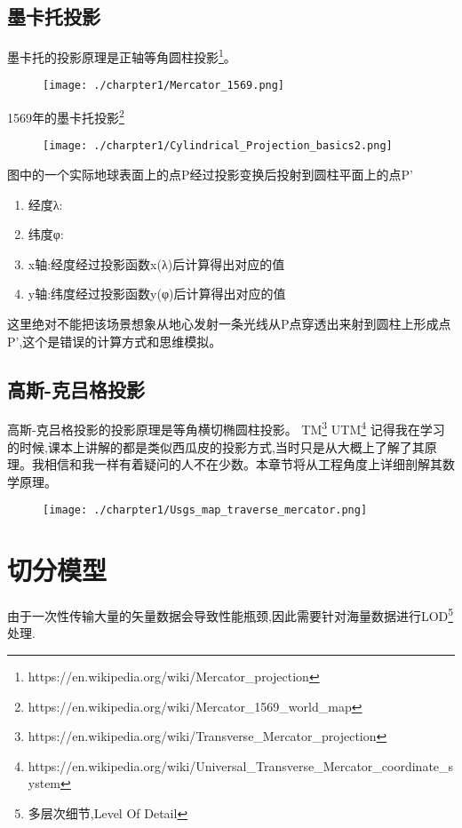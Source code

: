 \subsection{墨卡托投影}
墨卡托的投影原理是正轴等角圆柱投影\footnote{https://en.wikipedia.org/wiki/Mercator\_projection}。
\begin{figure}[!htb]
	\centering
	\texttt{[image: ./charpter1/Mercator\_1569.png]}
\end{figure}
1569年的墨卡托投影\footnote{https://en.wikipedia.org/wiki/Mercator\_1569\_world\_map}


\begin{figure}[!htb]
	\centering
	\texttt{[image: ./charpter1/Cylindrical\_Projection\_basics2.png]}
\end{figure}
图中的一个实际地球表面上的点P经过投影变换后投射到圆柱平面上的点P'
\begin{enumerate}
	\item 经度λ:
	\item 纬度φ:
	\item x轴:经度经过投影函数x(λ)后计算得出对应的值
	\item y轴:纬度经过投影函数y(φ)后计算得出对应的值
\end{enumerate}

\begin{note}
	这里绝对不能把该场景想象从地心发射一条光线从P点穿透出来射到圆柱上形成点P',这个是错误的计算方式和思维模拟。
\end{note}

\subsection{高斯-克吕格投影}
高斯-克吕格投影的投影原理是等角横切椭圆柱投影。
TM\footnote{https://en.wikipedia.org/wiki/Transverse\_Mercator\_projection}
UTM\footnote{https://en.wikipedia.org/wiki/Universal\_Transverse\_Mercator\_coordinate\_system}
记得我在学习的时候,课本上讲解的都是类似西瓜皮的投影方式,当时只是从大概上了解了其原理。我相信和我一样有着疑问的人不在少数。本章节将从工程角度上详细剖解其数学原理。
\begin{figure}[!htb]
	\centering
	\texttt{[image: ./charpter1/Usgs\_map\_traverse\_mercator.png]}
\end{figure}



\section{切分模型}
由于一次性传输大量的矢量数据会导致性能瓶颈,因此需要针对海量数据进行LOD\footnote{多层次细节,Level Of Detail}处理.

